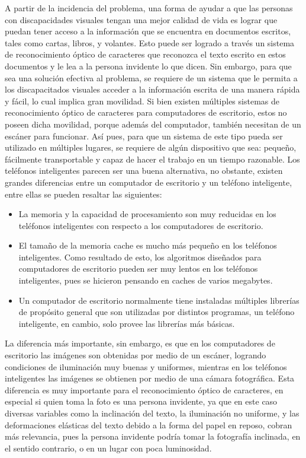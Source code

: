 \documentclass[a4paper, 11pt, oneside]{article}
\begin{document}
	A partir de la incidencia del problema, una forma de ayudar a que las personas con discapacidades visuales tengan una mejor calidad de vida es lograr que puedan tener acceso a la información que se encuentra en documentos escritos, tales como cartas, libros, y volantes. Esto puede ser logrado a través un sistema de reconocimiento óptico de caracteres que reconozca el texto escrito en estos documentos y le lea a la persona invidente lo que dicen. Sin embargo, para que sea una solución efectiva al problema, se requiere de un sistema que le permita a los discapacitados visuales acceder a la información escrita de una manera rápida y fácil, lo cual implica gran movilidad. Si bien existen múltiples sistemas de reconocimiento óptico de caracteres para computadores de escritorio, estos no poseen dicha movilidad, porque además del computador, también necesitan de un escáner para funcionar. Así pues, para que un sistema de este tipo pueda ser utilizado en múltiples lugares, se requiere de algún dispositivo que sea: pequeño, fácilmente transportable y capaz de hacer el trabajo en un tiempo razonable. Los teléfonos inteligentes parecen ser una buena alternativa, no obstante, existen grandes diferencias entre un computador de escritorio y un teléfono inteligente, entre ellas se pueden resaltar las siguientes:
	
	\begin{itemize}
	
	\item La memoria y la capacidad de procesamiento son muy reducidas en los teléfonos inteligentes con respecto a los computadores de escritorio.

	\item El tamaño de la memoria cache es mucho más pequeño en los teléfonos inteligentes. Como resultado de esto, los algoritmos diseñados para computadores de escritorio pueden ser muy lentos en los teléfonos inteligentes, pues se hicieron pensando en caches de varios megabytes.

	\item Un computador de escritorio normalmente tiene instaladas múltiples librerías de propósito general que son utilizadas por distintos programas, un teléfono inteligente, en cambio, solo provee las librerías más básicas.

	\end{itemize}

	La diferencia más importante, sin embargo, es que en los computadores de escritorio las imágenes son obtenidas por medio de un escáner, logrando condiciones de iluminación muy buenas y uniformes, mientras en los teléfonos inteligentes las imágenes se obtienen por medio de una cámara fotográfica. Esta diferencia es muy importante para el reconocimiento óptico de caracteres, en especial si quien toma la foto es una persona invidente, ya que en este caso diversas variables como la inclinación del texto, la iluminación no uniforme, y las deformaciones elásticas del texto debido a la forma del papel en reposo, cobran más relevancia, pues la persona invidente podría tomar la fotografía inclinada, en el sentido contrario, o en un lugar con poca luminosidad.
\end{document}
